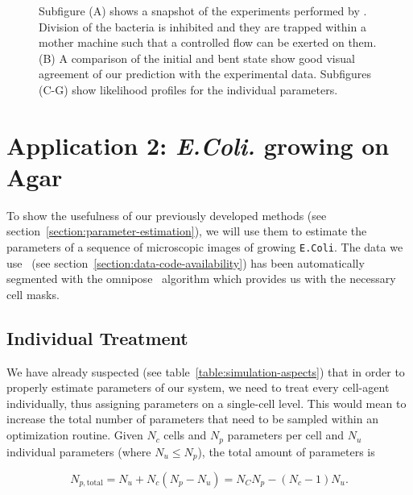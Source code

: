 \documentclass{article}
\begin{document}
\begin{figure}
\begin{minipage}{0.66\textwidth}
\begin{tikzonimage}[width=0.33\textwidth]
        \end{tikzonimage}%
    \end{minipage}
    \caption{
        Subfigure (A) shows a snapshot of the experiments performed by \cite{Amir2014_2}.
        Division of the bacteria is inhibited and they are trapped within a mother machine such that
        a controlled flow can be exerted on them.
        (B) A comparison of the initial and bent state show good visual agreement of our prediction
        with the experimental data.
        Subfigures (C-G) show likelihood profiles for the individual parameters.
    }
    \label{fig:amir-bending-simulation}
\end{figure}


\section{Application 2: \textit{E.Coli.} growing on Agar}
\label{section:application-2}

To show the usefulness of our previously developed methods (see
section~\ref{section:parameter-estimation}), we will use them to estimate the parameters of a
sequence of microscopic images of growing \texttt{E.Coli}.
The data we use~\cite{https://doi.org/10.3203/iwf/k-129} (see
section~\ref{section:data-code-availability}) has been automatically segmented with the
omnipose~\cite{Cutler2022} algorithm which provides us with the necessary cell masks.

\subsection{Individual Treatment}
We have already suspected (see table~\ref{table:simulation-aspects}) that in order to properly
estimate parameters of our system, we need to treat every cell-agent individually, thus assigning
parameters on a single-cell level.
This would mean to increase the total number of parameters that need to be sampled within an
optimization routine.
Given $N_c$ cells and $N_p$ parameters per cell and $N_u$ individual parameters (where
$N_u\leq N_p$), the total amount of parameters is

\begin{equation}
    N_{p,\text{total}} = N_u + N_c (N_p - N_u) = N_C N_p - (N_c - 1) N_u.
\end{equation}
\end{document}
